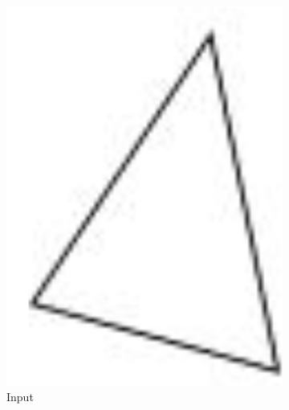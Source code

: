 \begin{figure}
	\centering
	\begin{subfigure}{0.18\columnwidth}
		\centering
		\includegraphics[width=\textwidth]{content/img/implementation/tessellation_input.png}
		\caption{Input}
		\label{fig:implementation:step:input}
	\end{subfigure}
	\begin{subfigure}{0.18\columnwidth}
		\centering

\end{subfigure}
\end{figure}
